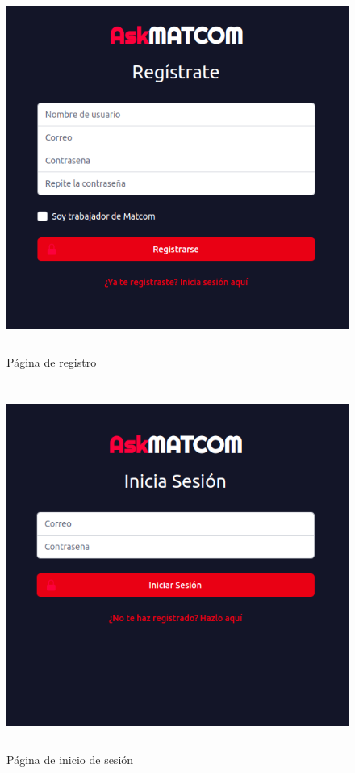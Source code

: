 \begin{figure}[h]
\begin{center}
	\includegraphics[width=12cm, height=12cm]{signup_page.png}
	\caption{Página de registro}
	\label{fig:signup}
\end{center}
	
\end{figure}

\begin{figure}[h]
	\begin{center}
		\includegraphics[width=12cm, height=12cm]{login_page.png}
		\caption{Página de inicio de sesión}
		\label{fig:login}
	\end{center}
	
\end{figure}

